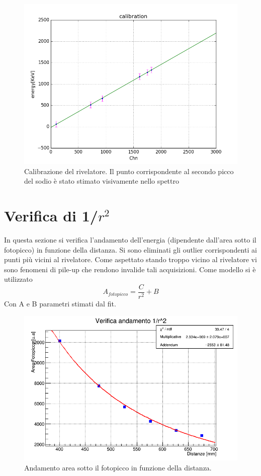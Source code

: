 \documentclass[a4paper]{article}
\begin{document}
\begin{figure}[!h]
\includegraphics[width=1\textwidth]{calibrazione}
        \caption{Calibrazione del rivelatore. Il punto corrispondente al secondo picco del sodio è stato stimato visivamente nello spettro}
        \label{fig:2}
\end{figure}





\section{Verifica di 1/$r^2$}
In questa sezione si verifica l'andamento dell'energia (dipendente dall'area sotto il fotopicco) in funzione della distanza. Si sono eliminati gli outlier corrispondenti ai punti più vicini al rivelatore. Come aspettato stando troppo vicino al rivelatore vi sono fenomeni di pile-up che rendono invalide tali acquisizioni. Come modello si è utilizzato \begin{equation}
A_{fotopicco}=\frac{C}{r^{2}}+B
\end{equation}
Con A e B parametri stimati dal fit.
\begin{figure}[!h]
\includegraphics[width=1\textwidth]{inverserootlawwithpars}
        \caption{Andamento area sotto il fotopicco in funzione della distanza.}
        \label{fig:2}
\end{figure}
\end{document}
